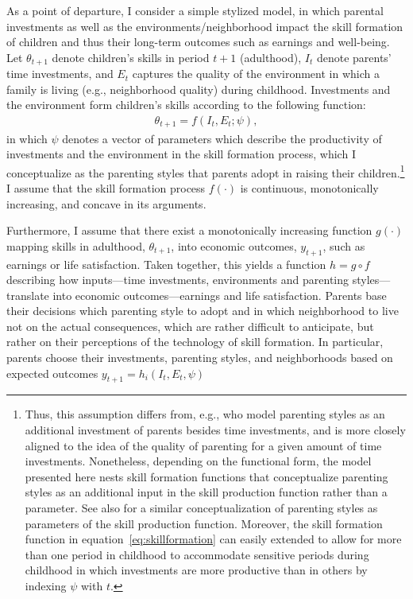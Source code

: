 \documentclass[12pt, a4paper, english]{article}
\begin{document}
As a point of departure, I consider a simple stylized model, in which parental investments as well as the environments/neighborhood impact the skill formation of children and thus their long-term outcomes such as earnings and well-being. Let $\theta_{t+1}$ denote children's skills in period $t+1$ (adulthood), $I_t$ denote parents' time investments, and $E_t$ captures the quality of the environment in which a family is living (e.g., neighborhood quality) during childhood. Investments and the environment form children's skills according to the following function:
\begin{align}
\theta_{t+1} = f(I_t, E_t; \psi), \label{eq:skillformation}
\end{align}
in which $\psi$ denotes a vector of parameters which describe the productivity of investments and the environment in the skill formation process, which I conceptualize as the parenting styles that parents adopt in raising their children.\footnote{Thus, this assumption differs from, e.g., \citet{Deckersetal2017Balu} who model parenting styles as an additional investment of parents besides time investments, and is more closely aligned to the idea of the quality of parenting for a given amount of time investments. Nonetheless, depending on the functional form, the model presented here nests skill formation functions that conceptualize parenting styles as an additional input in the skill production function rather than a parameter. See also \citet{Cunha2015} for a similar conceptualization of parenting styles as parameters of the skill production function. Moreover, the skill formation function in equation~\eqref{eq:skillformation} can easily extended to allow for more than one period in childhood to accommodate sensitive periods during childhood in which investments are more productive than in others \citep{CunhaHeckman2007} by indexing $\psi$ with $t$.} I assume that the skill formation process $f(\cdot)$ is continuous, monotonically increasing, and concave in its arguments.

Furthermore, I assume that there exist a monotonically increasing function $g(\cdot)$ mapping skills in adulthood, $\theta_{t+1}$, into economic outcomes, $y_{t+1}$, such as earnings or life satisfaction. Taken together, this yields a function $h=g \circ f$ describing how inputs---time investments, environments and parenting styles---translate into economic outcomes---earnings and life satisfaction. Parents base their decisions which parenting style to adopt and in which neighborhood to live not on the actual consequences, which are rather difficult to anticipate, but rather on their perceptions of the technology of skill formation. In particular, parents choose their investments, parenting styles, and neighborhoods based on expected outcomes $y_{t+1}=h_i(I_t,E_t,\psi)$
\end{document}
